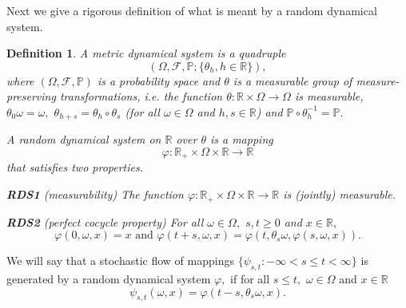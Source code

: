 \documentclass[a4paper,12pt]{article}
\newcommand{\1}{1\!\!\,{\rm I}}
\theoremstyle{plain}
\newtheorem{definition}{Definition}[section]
\begin{document}
Next we give a rigorous definition of what is meant by a random dynamical system.


\begin{definition}  \label{def12} \cite[Def. 1.1.1]{Arnold} A metric dynamical system is a quadruple 
	$$
	(\Omega,\mathcal{F},\mathbb{P};\{\theta_h,h\in\mathbb{R}\}),
	$$
	where $(\Omega,\mathcal{F},\mathbb{P})$ is a probability space and $\theta$ is a measurable group of measure-preserving transformations, i.e. the function $\theta:\mathbb{R}\times\Omega\to\Omega$ is measurable, $\theta_0\omega=\omega,$ $\theta_{h+s}=\theta_h\circ \theta_s$ (for all $\omega\in\Omega$ and $h,s\in\mathbb{R}$) and $\mathbb{P}\circ \theta^{-1}_h=\mathbb{P}.$ 
	
	A random dynamical system on $\mathbb{R}$ over $\theta$ is a mapping 
	$$
	\varphi:\mathbb{R}_+\times\Omega\times \mathbb{R}\to \mathbb{R}
	$$
	that satisfies two properties.
	
	{\bf RDS1} (measurability) The function $\varphi:\mathbb{R}_+\times\Omega\times \mathbb{R}\to \mathbb{R}$ 	is (jointly) measurable.
	
	{\bf RDS2} (perfect cocycle property)  For all $\omega\in \Omega,$  $s,t\geq 0$ and $x\in \mathbb{R},$ 
	$$
	\varphi(0,\omega,x)=x \mbox{ and }	\varphi(t+s,\omega,x)=\varphi(t,\theta_s\omega,\varphi(s,\omega,x)).
	$$
\end{definition}
We will say that a stochastic flow of mappings $\{\psi_{s,t}:-\infty<s\leq t<\infty\}$ is generated by a random dynamical system $\varphi,$ if for all $s\leq t,$ $\omega\in \Omega$ and $x\in \mathbb{R}$
\begin{equation}
\label{eq_rds}
\psi_{s,t}(\omega,x)=\varphi(t-s,\theta_s\omega,x).
\end{equation}
\end{document}

